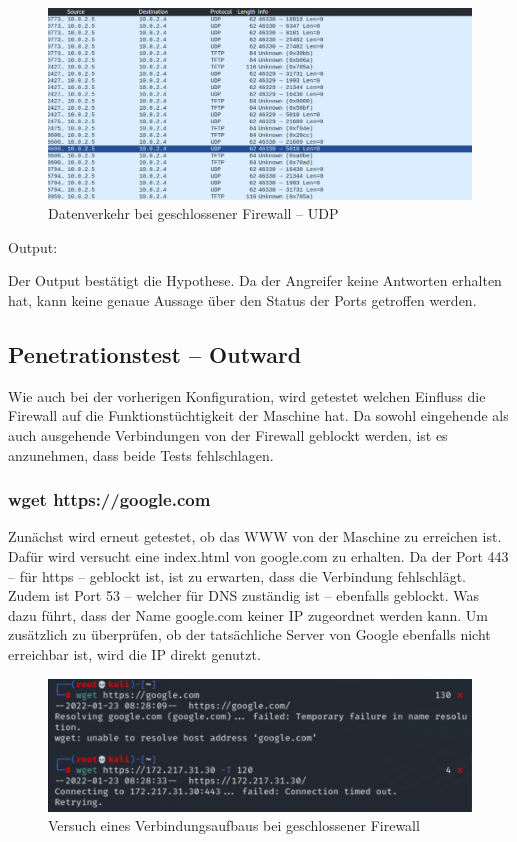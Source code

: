 \begin{figure}
	\includegraphics[width=\linewidth]{img/ws_firewall_closed_udp.png}
	\caption{Datenverkehr bei geschlossener Firewall – UDP}
	\label{fig:ws_firewall_closed_udp}
\end{figure}
Output:


Der Output bestätigt die Hypothese. Da der Angreifer keine Antworten erhalten hat, kann keine genaue Aussage über den Status der Ports getroffen werden. 

\subsection{Penetrationstest – Outward}
Wie auch bei der vorherigen Konfiguration, wird getestet welchen Einfluss die Firewall auf die Funktionstüchtigkeit der Maschine hat. 
Da sowohl eingehende als auch ausgehende Verbindungen von der Firewall geblockt werden, ist es anzunehmen, dass beide Tests fehlschlagen.

\subsubsection*{wget https://google.com}
Zunächst wird erneut getestet, ob das WWW von der Maschine zu erreichen ist. Dafür wird versucht eine index.html von google.com zu erhalten. Da der Port 443 – für https – geblockt ist, ist zu erwarten, dass die Verbindung fehlschlägt. Zudem ist Port 53 – welcher für DNS zuständig ist – ebenfalls geblockt. Was dazu führt, dass der Name google.com keiner IP zugeordnet werden kann. Um zusätzlich zu überprüfen, ob der tatsächliche Server von Google ebenfalls nicht erreichbar ist, wird die IP direkt genutzt. 

\begin{figure}
	\includegraphics[width=\linewidth]{img/closed-in-out-output.png}
	\caption{Versuch eines Verbindungsaufbaus bei geschlossener Firewall}
	\label{fig:closed_in_out}
\end{figure}

